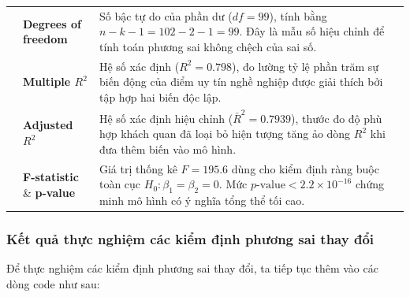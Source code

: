\begin{table}[H]
\begin{tabularx}{\textwidth}{l p{3.2cm} X}
			\addlinespace
			& \textbf{Degrees of freedom} & Số bậc tự do của phần dư ($df = 99$), tính bằng $n - k - 1 = 102 - 2 - 1 = 99$. Đây là mẫu số hiệu chỉnh để tính toán phương sai không chệch của sai số. \\
			\addlinespace
			& \textbf{Multiple $R^2$} & Hệ số xác định ($R^2 = 0.798$), đo lường tỷ lệ phần trăm sự biến động của điểm uy tín nghề nghiệp được giải thích bởi tập hợp hai biến độc lập. \\
			\addlinespace
			& \textbf{Adjusted $R^2$} & Hệ số xác định hiệu chỉnh ($\bar{R}^2 = 0.7939$), thước đo độ phù hợp khách quan đã loại bỏ hiện tượng tăng ảo dòng $R^2$ khi đưa thêm biến vào mô hình. \\
			\addlinespace
			& \textbf{F-statistic} \& \textbf{p-value} & Giá trị thống kê $F = 195.6$ dùng cho kiểm định ràng buộc toàn cục $H_0: \beta_1 = \beta_2 = 0$. Mức $p\text{-value} < 2.2 \times 10^{-16}$ chứng minh mô hình có ý nghĩa tổng thể tối cao. \\
			\bottomrule
		\end{tabularx}
	\end{table}
	\subsubsection{Kết quả thực nghiệm các kiểm định phương sai thay đổi}
	Để thực nghiệm các kiểm định phương sai thay đổi, ta tiếp tục thêm vào các dòng code như sau:\\
    \noindent{}
